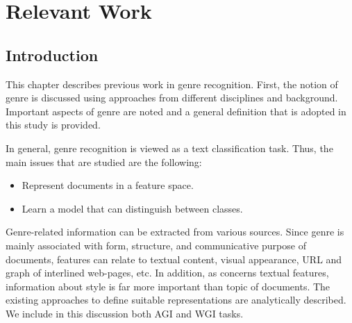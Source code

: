 
\chapter{Relevant Work}

\label{chap:relevant_work}


\newcommand{\keyword}[1]{\textbf{#1}}
\newcommand{\tabhead}[1]{\textbf{#1}}
\newcommand{\code}[1]{\texttt{#1}}
\newcommand{\file}[1]{\texttt{\bfseries#1}}
\newcommand{\option}[1]{\texttt{\itshape#1}}


\section{Introduction}\label{chap:relevant_work:sec:intro}

This chapter describes previous work in genre recognition. First, the notion of genre is discussed using approaches from different disciplines and background. Important aspects of genre are noted and a general definition that is adopted in this study is provided.

In general, genre recognition is viewed as a text classification task. Thus, the main issues that are studied are the following:

\begin{itemize}
    \item Represent documents in a feature space.
    \item Learn a model that can distinguish between classes.
\end{itemize}

Genre-related information can be extracted from various sources. Since genre is mainly associated with form, structure, and communicative purpose of documents, features can relate to textual content, visual appearance, URL and graph of interlined web-pages, etc. In addition, as concerns textual features, information about style is far more important than topic of documents. The existing approaches to define suitable representations are analytically described. We include in this discussion both AGI and WGI tasks.

